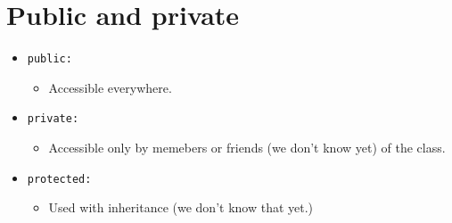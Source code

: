 \section{Public and private}
\begin{itemize}
    \item \texttt{public:}
        \begin{itemize}
            \item Accessible everywhere.
        \end{itemize}
    
    \item \texttt{private:}
        \begin{itemize}
            \item Accessible only by memebers or friends (we don't know yet) of the class.
        \end{itemize}
    
    \item \texttt{protected:}
        \begin{itemize}
            \item Used with inheritance (we don't know that yet.)
        \end{itemize}
\end{itemize}

